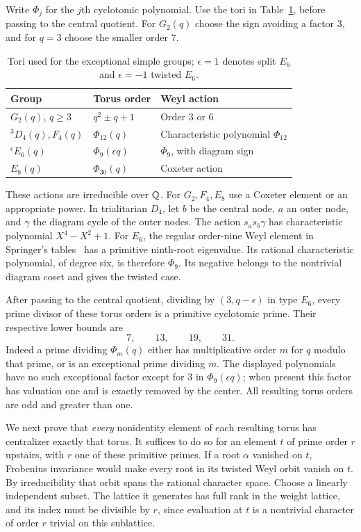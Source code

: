 Write $\Phi_j$ for the $j$th cyclotomic polynomial. Use the tori
in Table~\ref{tab:finite-exceptional-tori}, before passing to the
central quotient. For $G_2(q)$ choose the sign avoiding a factor
$3$, and for $q=3$ choose the smaller order $7$.
\begin{table}[htbp]
\centering
\begin{tabular}{lll}
\toprule
Group & Torus order & Weyl action\\
\midrule
$G_2(q)$, $q\ge3$ & $q^2\pm q+1$ & Order $3$ or $6$\\
${}^3D_4(q),F_4(q)$ & $\Phi_{12}(q)$ & Characteristic polynomial $\Phi_{12}$\\
${}^{\epsilon}E_6(q)$ & $\Phi_9(\epsilon q)$ & $\Phi_9$, with diagram sign\\
$E_8(q)$ & $\Phi_{30}(q)$ & Coxeter action\\
\bottomrule
\end{tabular}
\caption{Tori used for the exceptional simple groups;
$\epsilon=1$ denotes split $E_6$ and $\epsilon=-1$ twisted $E_6$.}
\label{tab:finite-exceptional-tori}
\end{table}

These actions are irreducible over $\mathbb Q$. For $G_2,F_4,E_8$ use
a Coxeter element or an appropriate power. In trialitarian $D_4$,
let $b$ be the central node, $a$ an outer node, and $\gamma$ the
diagram cycle of the outer nodes. The action $s_a s_b\gamma$ has
characteristic polynomial $X^4-X^2+1$. For $E_6$, the regular
order-nine Weyl element in Springer's
tables~\cite[Section 5.4, Table 1]{Springer} has
a primitive ninth-root eigenvalue. Its rational characteristic
polynomial, of degree six, is therefore $\Phi_9$. Its negative
belongs to the nontrivial diagram coset and gives the twisted
case.

After passing to the central quotient, dividing by $(3,q-\epsilon)$
in type $E_6$, every prime divisor of these torus orders is a
primitive cyclotomic prime. Their respective lower bounds are
\[
 7,\qquad13,\qquad19,\qquad31.
\]
Indeed a prime dividing $\Phi_m(q)$ either has multiplicative
order $m$ for $q$ modulo that prime, or is an exceptional prime
dividing $m$. The displayed polynomials have no such exceptional
factor except for $3$ in $\Phi_9(\epsilon q)$; when present this
factor has valuation one and is exactly removed by the center.
All resulting torus orders are odd and greater than one.

We next prove that \emph{every} nonidentity element of each resulting
torus has centralizer exactly that torus. It suffices to do so for
an element $t$ of prime order $r$ upstairs, with $r$ one of these
primitive primes. If a root $\alpha$ vanished on $t$, Frobenius
invariance would make every root in its twisted Weyl orbit vanish
on $t$. By irreducibility that orbit spans the rational character
space. Choose a linearly independent subset. The lattice it
generates has full rank in the weight lattice, and its index must
be divisible by $r$, since evaluation at $t$ is a nontrivial
character of order $r$ trivial on this sublattice.

